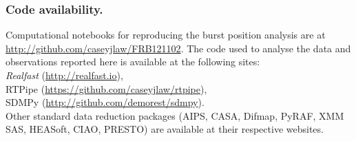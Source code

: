 \documentclass{nature_frb}
\begin{document}
\subsubsection*{Code availability.}
Computational notebooks for reproducing the burst position analysis are at \url{http://github.com/caseyjlaw/FRB121102}.
The code used to analyse the data and observations reported here is available at the following sites:\\
{\em Realfast} (\url{http://realfast.io}),\\
{RTPipe} (\url{https://github.com/caseyjlaw/rtpipe}),\\
{SDMPy} (\url{http://github.com/demorest/sdmpy}).\\
Other standard data reduction packages (AIPS, CASA, Difmap, PyRAF, XMM SAS, HEASoft, CIAO, PRESTO) are available at their respective websites.



\clearpage




\end{document}
